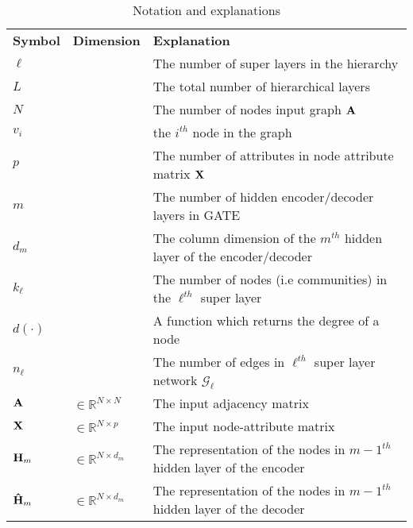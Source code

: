 \documentclass[a4paper,12pt]{article}
\begin{document}
\newpage
\appendix
\begin{table}[!ht]
	\centering
	\caption{Notation and explanations}
	\begin{tabular}{p{2cm}|p{3cm}|p{10cm}}
		\toprule[0.08cm]
		\bf Symbol & \centering \bf Dimension & \bf Explanation \\
		\cmidrule(lr){1-3}
		$\ell$ & & The number of super layers in the hierarchy \\
		
		$L$ & & The total number of hierarchical layers  \\
		
		$N$ & & The number of nodes input graph ${\bf A}$ \\
		
		$v_i$ & & the $i^{th}$ node in the graph \\
		
		$p$ & & The number of attributes in node attribute matrix $\bf X$ \\
		
		$m$ & & The number of hidden encoder/decoder layers in GATE \\
		
		$d_m$ & & The column dimension of the $m^{th}$ hidden layer of the encoder/decoder \\
		
		$k_\ell$ & & The number of nodes (i.e communities) in the $\ell^{th}$ super layer \\
		
		$d(\cdot)$ & & A function which returns the degree of a node \\
		
		$n_\ell$ & & The number of edges in $\ell^{th}$ super layer network $\mathcal{G}_{\ell}$ \\
		
		${\bf A}$ & $ \in \mathbb{R}^{N \times N}$ & The input adjacency matrix \\
		
		${\bf X}$ &$\in \mathbb{R}^{N \times p}$ & The input node-attribute matrix \\
		
		${\bf H}_{m}$ & $\in \mathbb{R}^{N \times d_{m}}$ & The representation of the nodes in ${m-1}^{th}$ hidden layer of the encoder\\
		
		${\bf \hat{H}}_{m}$ & $\in \mathbb{R}^{N \times d_{m}}$ & The representation of the nodes in ${m-1}^{th}$ hidden layer of the decoder\\
		

\end{tabular}
\end{table}
\end{document}
